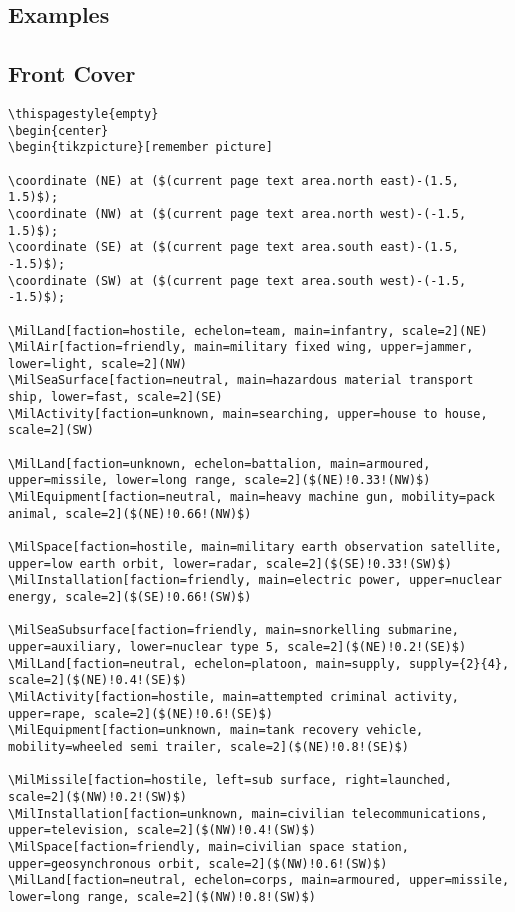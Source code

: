 \documentclass[a4paper, titlepage]{article}
\newenvironment{writett}{\ttfamily}{\par}
\begin{document}
\begin{landscape}

\section{Examples}

\subsection{Front Cover}

\begin{writett}
\begin{verbatim}
\thispagestyle{empty}
\begin{center}
\begin{tikzpicture}[remember picture]

\coordinate (NE) at ($(current page text area.north east)-(1.5, 1.5)$);
\coordinate (NW) at ($(current page text area.north west)-(-1.5, 1.5)$);
\coordinate (SE) at ($(current page text area.south east)-(1.5, -1.5)$);
\coordinate (SW) at ($(current page text area.south west)-(-1.5, -1.5)$);

\MilLand[faction=hostile, echelon=team, main=infantry, scale=2](NE)
\MilAir[faction=friendly, main=military fixed wing, upper=jammer, lower=light, scale=2](NW)
\MilSeaSurface[faction=neutral, main=hazardous material transport ship, lower=fast, scale=2](SE)
\MilActivity[faction=unknown, main=searching, upper=house to house, scale=2](SW)

\MilLand[faction=unknown, echelon=battalion, main=armoured, upper=missile, lower=long range, scale=2]($(NE)!0.33!(NW)$)
\MilEquipment[faction=neutral, main=heavy machine gun, mobility=pack animal, scale=2]($(NE)!0.66!(NW)$)

\MilSpace[faction=hostile, main=military earth observation satellite, upper=low earth orbit, lower=radar, scale=2]($(SE)!0.33!(SW)$)
\MilInstallation[faction=friendly, main=electric power, upper=nuclear energy, scale=2]($(SE)!0.66!(SW)$)

\MilSeaSubsurface[faction=friendly, main=snorkelling submarine, upper=auxiliary, lower=nuclear type 5, scale=2]($(NE)!0.2!(SE)$)
\MilLand[faction=neutral, echelon=platoon, main=supply, supply={2}{4}, scale=2]($(NE)!0.4!(SE)$)
\MilActivity[faction=hostile, main=attempted criminal activity, upper=rape, scale=2]($(NE)!0.6!(SE)$)
\MilEquipment[faction=unknown, main=tank recovery vehicle, mobility=wheeled semi trailer, scale=2]($(NE)!0.8!(SE)$)

\MilMissile[faction=hostile, left=sub surface, right=launched, scale=2]($(NW)!0.2!(SW)$)
\MilInstallation[faction=unknown, main=civilian telecommunications, upper=television, scale=2]($(NW)!0.4!(SW)$)
\MilSpace[faction=friendly, main=civilian space station, upper=geosynchronous orbit, scale=2]($(NW)!0.6!(SW)$)
\MilLand[faction=neutral, echelon=corps, main=armoured, upper=missile, lower=long range, scale=2]($(NW)!0.8!(SW)$)


\end{verbatim}
\end{writett}
\end{landscape}
\end{document}
